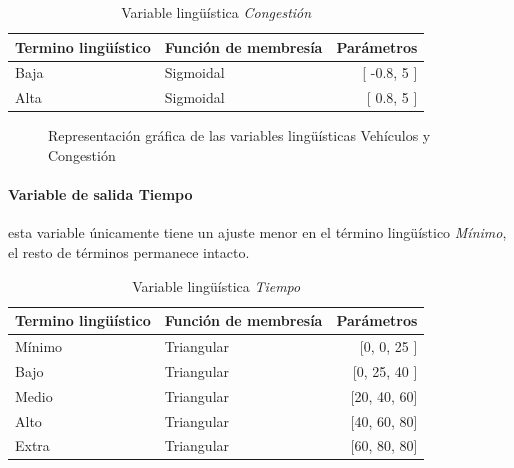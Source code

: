 \begin{table}[!h]
	\centering
	\begin{tabular}{llr} \toprule
		Termino lingüístico & Función de membresía & Parámetros \\ \midrule
		Baja & Sigmoidal & [ -0.8, 5 ] \\
		Alta & Sigmoidal & [ 0.8, 5 ] \\ \bottomrule
	\end{tabular}
	\caption{Variable lingüística \textit{Congestión}}
\end{table}
\begin{figure}[H]
	\centering
	\caption[Gráficas de las variables lingüísticas vehículos y congestión]{Representación gráfica de las variables lingüísticas Vehículos y Congestión }
\end{figure}

\paragraph{Variable de salida Tiempo} esta variable únicamente tiene un ajuste menor en el término lingüístico \textit{Mínimo}, el resto de términos permanece intacto.

\begin{table}[!h]
	\centering
	\begin{tabular}{llr} \toprule
		Termino lingüístico & Función de membresía & Parámetros \\ \midrule
		Mínimo & Triangular & [0, 0, 25 ] \\
		Bajo & Triangular & [0, 25, 40 ] \\
		Medio & Triangular & [20, 40, 60] \\
		Alto & Triangular & [40, 60, 80] \\
		Extra & Triangular & [60, 80, 80] \\ \bottomrule
	\end{tabular}
	\caption{Variable lingüística \textit{Tiempo}}
\end{table}

